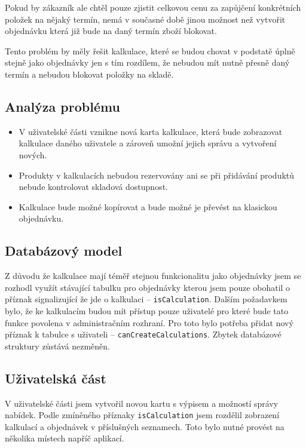 Pokud by zákazník ale chtěl pouze zjistit celkovou cenu za zapůjčení konkrétních položek na nějaký termín, nemá v současné době jinou možnost než vytvořit objednávku která již bude na daný termín zboží blokovat.

Tento problém by měly řešit kalkulace, které se budou chovat v podstatě úplně stejně jako objednávky jen s tím rozdílem, že nebudou mít nutně přesně daný termín a nebudou blokovat položky na skladě.

\subsection{Analýza problému}

\begin{itemize}
    \item V uživatelské části vznikne nová karta kalkulace, která bude zobrazovat kalkulace daného uživatele a zároveň umožní jejich správu a vytvoření nových.
    \item Produkty v kalkulacích nebudou rezervovány ani se při přidávání produktů nebude kontrolovat skladová dostupnost.
    \item Kalkulace bude možné kopírovat a bude možné je převést na klasickou objednávku.
\end{itemize}

\subsection{Databázový model}

Z důvodu že kalkulace mají téměř stejnou funkcionalitu jako objednávky jsem se rozhodl využít stávající tabulku pro objednávky kterou jsem pouze obohatil o příznak signalizující že jde o kalkulaci -- \lstinline{isCalculation}. 
Dalším požadavkem bylo, že ke kalkulacím budou mít přístup pouze uživatelé pro které bude tato funkce povolena v administračním rozhraní. Pro toto bylo potřeba přidat nový příznak k tabulce s uživateli -- \lstinline{canCreateCalculations}. Zbytek databázové struktury zůstává nezměněn. 

\subsection{Uživatelská část}

V uživatelské části jsem vytvořil novou kartu s výpisem a možností správy nabídek. Podle zmíněného příznaky \lstinline{isCalculation} jsem rozdělil zobrazení kalkulací a objednávek v příslušných seznamech. Toto bylo nutné provést na několika místech napříč aplikací.

